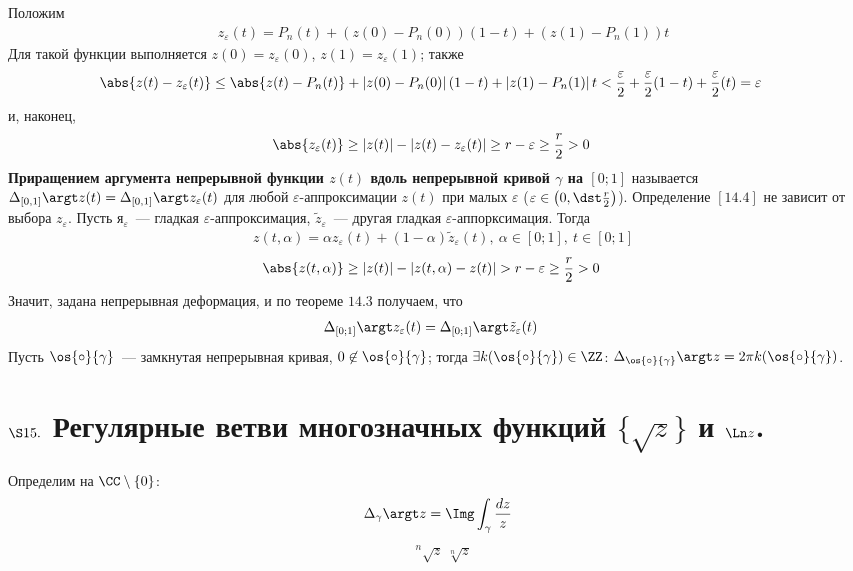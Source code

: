 Положим
\begin{align*}
  & z_\varepsilon(t) = P_n(t) + \left( z(0)-P_n(0) \right)\left( 1-t \right) + \left( z(1)-P_n(1) \right)t
\end{align*}
Для такой функции выполняется $z(0) = z_\varepsilon(0)$, $z(1) =
z_\varepsilon(1)$; также
\begin{align*}
  & \abs{z(t) - z_\varepsilon(t)} \leq \abs{z(t) - P_n(t)} + \left| z(0)-P_n(0) \right| \left( 1-t \right) + \left| z(1)-P_n(1) \right|t < \frac{\varepsilon}{2} + \frac{\varepsilon}{2}(1-t) + \frac{\varepsilon}{2}(t) = \varepsilon
\end{align*}
и, наконец,
\begin{align*}
  & \abs{z_\varepsilon(t)} \geq \left| z(t) \right| - \left| z(t) - z_\varepsilon(t) \right| \geq r - \varepsilon \geq \frac{r}{2} > 0
\end{align*}
\Def
\textbf{Приращением аргумента непрерывной функции $z(t)$ вдоль непрерывной
  кривой $\gamma$ на $[0;1]$} называется $\Delta_{[0,1]}\argt z(t) =
\Delta_{[0,1]}\argt z_\varepsilon(t)$ для любой $\varepsilon$-аппроксимации
$z(t)$ при малых $\varepsilon$ ($\varepsilon \in \left( 0, \dst \frac{r}{2}
\right)$).
\prop
Определение $[14.4]$ не зависит от выбора $z_\varepsilon$.
\pr
Пусть $я_\varepsilon$~--- гладкая $\varepsilon$-аппроксимация,
$\tilde{z}_\varepsilon$~--- другая гладкая $\varepsilon$-аппорксимация.
Тогда
\begin{align*}
  & z(t, \alpha) = \alpha z_\varepsilon(t) + (1-\alpha)\tilde{z}_\varepsilon(t), \ \alpha \in [0;1], \ t \in [0;1]
\end{align*}
\begin{align*}
  & \abs{z(t, \alpha)} \geq \left| z(t) \right| - \left| z(t, \alpha) - z(t) \right| > r - \varepsilon \geq \frac{r}{2} > 0
\end{align*}
Значит, задана непрерывная деформация, и по теореме $14.3$ получаем, что
\begin{align*}
  & \Delta_{[0;1]}\argt z_\varepsilon(t) = \Delta_{[0;1]}\argt \tilde{z}_\varepsilon(t)
\end{align*}
\corollary
Пусть $\os{\circ}{\gamma}$~--- замкнутая непрерывная кривая, $0 \not \in
\os{\circ}{\gamma}$; тогда $\exists k(\os{\circ}{\gamma})\in \ZZ$:
$\Delta_{\os{\circ}{\gamma}}\argt z = 2 \pi k(\os{\circ}{\gamma})$.
\section{$\S 15.$ Регулярные ветви многозначных функций $\{\sqrt{z}\}$ и $\Ln
  z$.}
Определим на $\CC\setminus\{0\}$:
\begin{equation}\label{(15.1)}
    \Delta_{\gamma}\argt z = \Img \int_{\gamma} \frac{dz}{z}
\end{equation}
\begin{align*}
  & ^n\sqrt{z} \ \sqrt[n]{z}
\end{align*}

